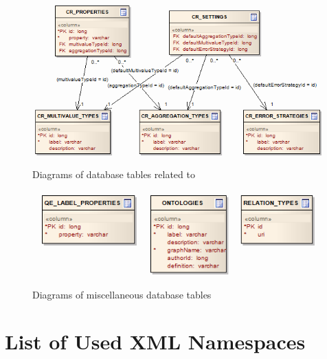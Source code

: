 \begin{figure}[htbp]
    \centering
    \includegraphics[scale=0.6]{images/db-cr.png}
    \caption{Diagrams of database tables related to \CR}
	\label{fig:dbCR}
\end{figure}

\begin{figure}[htbp]
    \centering
    \includegraphics[scale=0.6]{images/db-misc.png}
    \caption{Diagrams of miscellaneous database tables}
	\label{fig:dbMisc}
\end{figure}

\chapter{List of Used XML Namespaces}





